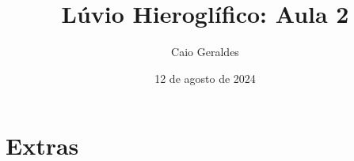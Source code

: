 \documentclass[article]{luvita}
\title{Lúvio Hieroglífico: Aula 2}
\author{Caio Geraldes}
\date{12 de agosto de 2024}
\begin{document}
\frontmatter

\mainmatter%

\maketitle




\backmatter%

\printbibliography%

\clearpage

\chapter*{Extras}

\end{document}

